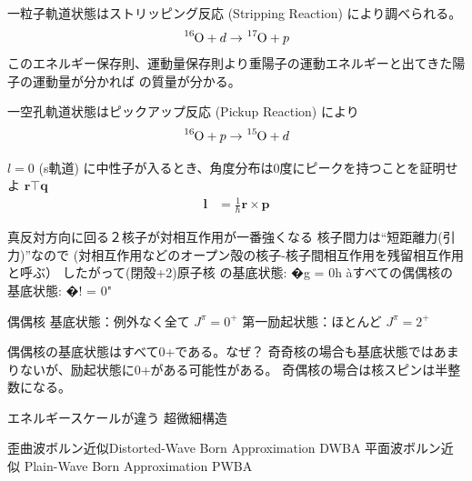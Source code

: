 \documentclass[uplatex,dvipdfmx,a4paper,11pt]{jlreq}
\newcommand{\rr}{\bm{r}}
\newcommand{\pp}{\bm{p}}
\numberwithin{equation}{section}
\theoremstyle{definition}
\begin{document}
⼀粒⼦軌道状態はストリッピング反応 (Stripping Reaction) により調べられる。
\begin{align}
  \ce{^16O} + d \to \ce{^17O} + p
\end{align}
このエネルギー保存則、運動量保存則より重陽子の運動エネルギーと出てきた陽子の運動量が分かれば  の質量が分かる。

⼀空孔軌道状態はピックアップ反応 (Pickup Reaction) により
\begin{align}
  \ce{^16O} + p \to \ce{^15O} + d
\end{align}


$l = 0$ (s軌道) に中性⼦が⼊るとき、⾓度分布は0度にピークを持つことを証明せよ
$\rr\top \bm{q}$
\begin{align}
  \bm{l} & = \frac{1}{\hbar}\rr\times\pp
\end{align}

真反対⽅向に回る２核⼦が対相互作⽤が⼀番強くなる
核⼦間⼒は“短距離⼒(引⼒)”なので
(対相互作⽤などのオープン殻の核⼦-核⼦間相互作⽤を残留相互作⽤と呼ぶ）
したがって(閉殻+2)原⼦核
の基底状態: �g = 0h
àすべての偶偶核の基底状態: �! = 0"

偶偶核
基底状態：例外なく全て $J^\pi = 0^+$
第⼀励起状態：ほとんど $J^\pi = 2^+$

偶偶核の基底状態はすべて0+である。なぜ？
奇奇核の場合も基底状態ではあまりないが、励起状態に0+がある可能性がある。
奇偶核の場合は核スピンは半整数になる。

エネルギースケールが違う
超微細構造

歪曲波ボルン近似Distorted-Wave Born Approximation DWBA
平⾯波ボルン近似 Plain-Wave Born Approximation PWBA
\end{document}
